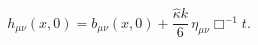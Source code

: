\begin{equation}\label{onbrane}
h_{\mu\nu}(x,0)=b_{\mu\nu}(x,0)+\frac{\hat \kappa
k}{6}\,\eta_{\mu\nu}\Box^{-1}t.
\end{equation}

